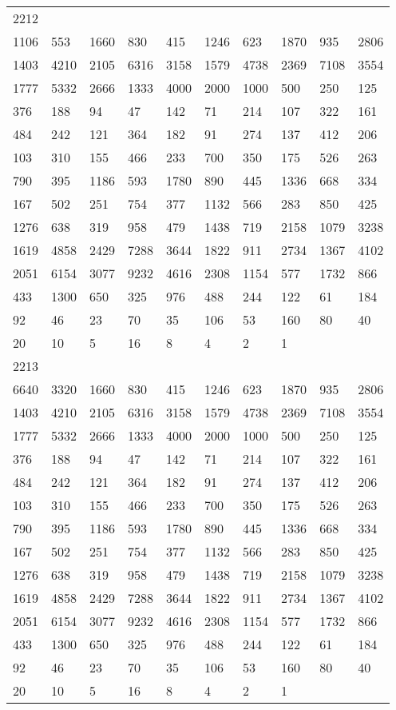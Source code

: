 \begin{longtable}{*{10}{l}}
2212&&&&&&&&&\\
1106& 553& 1660& 830& 415& 1246& 623& 1870& 935& 2806\\
1403& 4210& 2105& 6316& 3158& 1579& 4738& 2369& 7108& 3554\\
1777& 5332& 2666& 1333& 4000& 2000& 1000& 500& 250& 125\\
376& 188& 94& 47& 142& 71& 214& 107& 322& 161\\
484& 242& 121& 364& 182& 91& 274& 137& 412& 206\\
103& 310& 155& 466& 233& 700& 350& 175& 526& 263\\
790& 395& 1186& 593& 1780& 890& 445& 1336& 668& 334\\
167& 502& 251& 754& 377& 1132& 566& 283& 850& 425\\
1276& 638& 319& 958& 479& 1438& 719& 2158& 1079& 3238\\
1619& 4858& 2429& 7288& 3644& 1822& 911& 2734& 1367& 4102\\
2051& 6154& 3077& 9232& 4616& 2308& 1154& 577& 1732& 866\\
433& 1300& 650& 325& 976& 488& 244& 122& 61& 184\\
92& 46& 23& 70& 35& 106& 53& 160& 80& 40\\
20& 10& 5& 16& 8& 4& 2& 1& \\

2213&&&&&&&&&\\
6640& 3320& 1660& 830& 415& 1246& 623& 1870& 935& 2806\\
1403& 4210& 2105& 6316& 3158& 1579& 4738& 2369& 7108& 3554\\
1777& 5332& 2666& 1333& 4000& 2000& 1000& 500& 250& 125\\
376& 188& 94& 47& 142& 71& 214& 107& 322& 161\\
484& 242& 121& 364& 182& 91& 274& 137& 412& 206\\
103& 310& 155& 466& 233& 700& 350& 175& 526& 263\\
790& 395& 1186& 593& 1780& 890& 445& 1336& 668& 334\\
167& 502& 251& 754& 377& 1132& 566& 283& 850& 425\\
1276& 638& 319& 958& 479& 1438& 719& 2158& 1079& 3238\\
1619& 4858& 2429& 7288& 3644& 1822& 911& 2734& 1367& 4102\\
2051& 6154& 3077& 9232& 4616& 2308& 1154& 577& 1732& 866\\
433& 1300& 650& 325& 976& 488& 244& 122& 61& 184\\
92& 46& 23& 70& 35& 106& 53& 160& 80& 40\\
20& 10& 5& 16& 8& 4& 2& 1& \\


\end{longtable}
